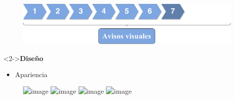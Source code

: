 \begin{slide}
  \begin{center}
    \begin{figure}[!h]
      \includegraphics[height=0.27\textheight]{img/ite7.png}
    \end{figure}
    \vspace{0.5cm}
    \begin{minipage}[b]{0.4\linewidth}
      \begin{block}<2->{\textbf{Diseño}}
        \begin{itemize}
          \item Apariencia
        \end{itemize}
      \end{block}
    \end{minipage}
    \begin{figure}
      \includegraphics<3->[height=0.22\textheight]{img/ic_turn_left.png}
      \includegraphics<3->[height=0.22\textheight]{img/ic_continue.png}
      \includegraphics<3->[height=0.22\textheight]{img/ic_turn_right.png}
      \includegraphics<3->[height=0.22\textheight]{img/ic_arrived.png}
    \end{figure}
  \end{center}
\end{slide}

